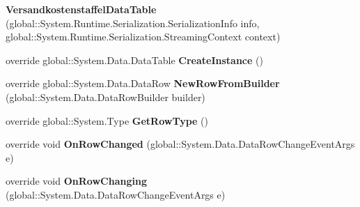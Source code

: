 \begin{DoxyCompactItemize}
\item 
{\bfseries Versandkostenstaffel\+Data\+Table} (global\+::\+System.\+Runtime.\+Serialization.\+Serialization\+Info info, global\+::\+System.\+Runtime.\+Serialization.\+Streaming\+Context context)\hypertarget{class_products_1_1_data_1_1ds_sage_1_1_versandkostenstaffel_data_table_a9cefaf55f1c6a4c2119a9d04165fe23c}{}\label{class_products_1_1_data_1_1ds_sage_1_1_versandkostenstaffel_data_table_a9cefaf55f1c6a4c2119a9d04165fe23c}

\item 
override global\+::\+System.\+Data.\+Data\+Table {\bfseries Create\+Instance} ()\hypertarget{class_products_1_1_data_1_1ds_sage_1_1_versandkostenstaffel_data_table_a10f77dc95fae66e5aab8d7d75a959d1d}{}\label{class_products_1_1_data_1_1ds_sage_1_1_versandkostenstaffel_data_table_a10f77dc95fae66e5aab8d7d75a959d1d}

\item 
override global\+::\+System.\+Data.\+Data\+Row {\bfseries New\+Row\+From\+Builder} (global\+::\+System.\+Data.\+Data\+Row\+Builder builder)\hypertarget{class_products_1_1_data_1_1ds_sage_1_1_versandkostenstaffel_data_table_aeb106a164c4ee2e812f9314e4ba2b855}{}\label{class_products_1_1_data_1_1ds_sage_1_1_versandkostenstaffel_data_table_aeb106a164c4ee2e812f9314e4ba2b855}

\item 
override global\+::\+System.\+Type {\bfseries Get\+Row\+Type} ()\hypertarget{class_products_1_1_data_1_1ds_sage_1_1_versandkostenstaffel_data_table_a5d485f4c5608f8930e7fce0a659c56bd}{}\label{class_products_1_1_data_1_1ds_sage_1_1_versandkostenstaffel_data_table_a5d485f4c5608f8930e7fce0a659c56bd}

\item 
override void {\bfseries On\+Row\+Changed} (global\+::\+System.\+Data.\+Data\+Row\+Change\+Event\+Args e)\hypertarget{class_products_1_1_data_1_1ds_sage_1_1_versandkostenstaffel_data_table_a9d43735fcf102fc08385127c743880ed}{}\label{class_products_1_1_data_1_1ds_sage_1_1_versandkostenstaffel_data_table_a9d43735fcf102fc08385127c743880ed}

\item 
override void {\bfseries On\+Row\+Changing} (global\+::\+System.\+Data.\+Data\+Row\+Change\+Event\+Args e)\hypertarget{class_products_1_1_data_1_1ds_sage_1_1_versandkostenstaffel_data_table_a82ebe8f447e84f7973ce4d395945cf09}{}\label{class_products_1_1_data_1_1ds_sage_1_1_versandkostenstaffel_data_table_a82ebe8f447e84f7973ce4d395945cf09}


\end{DoxyCompactItemize}
